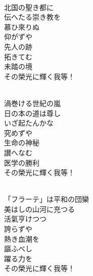 \documentclass[10pt,b5j]{tarticle} %
\begin{document}
\vspace{1.5em} %
\newcommand{\linespace}{0.5em} %
\newcommand{\blocksize}{0.5\hsize} %
\newcommand{\itemmargin}{3em} %
\begin{enumerate} %
    \setlength{\itemindent}{\itemmargin} %
    \begin{minipage}[c]{\blocksize}
    
        \vspace{\linespace}
        \item~\\
        北国の聖き都に\\
        伝へたる崇き教を\\
        慕ひ來りぬ\\
        仰がずや\\
        先人の跡\\
        拓きてむ\\
        未踏の境\\
        その榮光に輝く我等！
        
    \end{minipage}
    \begin{minipage}[c]{\blocksize}
        
        \vspace{\linespace}
        \item~\\
        渦巻ける世紀の嵐\\
        日の本の道は尊し\\
        いざ起たんかな\\
        究めずや\\
        生命の神秘\\
        讃へなむ\\
        医学の勝利\\
        その榮光に輝く我等！
        
    \end{minipage}
    \begin{minipage}[c]{\blocksize}
        
        \vspace{\linespace}
        \item~\\
        「フラーテ」は平和の団欒\\
        美はしの山河に充つる\\
        活氣亨けつつ\\
        誇らずや\\
        熱き血潮を\\
        謳ふべし\\
        躍る力を\\
        その榮光に輝く我等！
    
    \end{minipage}
\end{enumerate} %
\end{document}
